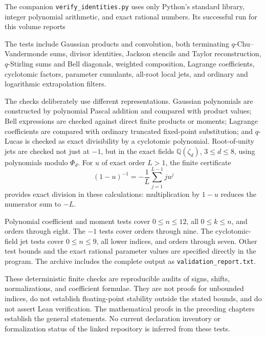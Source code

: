 \documentclass[11pt,a4paper,oneside,openany]{book}
\theoremstyle{definition}
\theoremstyle{remark}
\newcommand{\Q}{\mathbb Q}
\begin{document}
The companion \texttt{verify\_identities.py} uses only Python's standard
library, integer polynomial arithmetic, and exact rational numbers. Its successful
run for this volume reports
\begin{center}
\end{center}
The tests include Gaussian products and convolution, both terminating
\(q\)-Chu--Vandermonde sums, divisor identities, Jackson stencils and Taylor
reconstruction, \(q\)-Stirling sums and Bell diagonals, weighted composition,
Lagrange coefficients, cyclotomic factors, parameter cumulants, all-root local
jets, and ordinary and logarithmic extrapolation filters.

The checks deliberately use different representations. Gaussian polynomials are
constructed by polynomial Pascal addition and compared with product values;
Bell expressions are checked against direct finite products or moments;
Lagrange coefficients are compared with ordinary truncated fixed-point
substitution; and \(q\)-Lucas is checked as exact divisibility by a
cyclotomic polynomial. Root-of-unity jets are checked not just at \(-1\),
but in the exact fields \(\Q(\zeta_d)\), \(3\le d\le8\), using
polynomials modulo \(\Phi_d\). For \(u\) of exact order \(L>1\),
the finite certificate
\[
 (1-u)^{-1}=-\frac1L\sum_{j=1}^{L-1}ju^j
\]
provides exact division in these calculations: multiplication by \(1-u\)
reduces the numerator sum to \(-L\).

Polynomial coefficient and moment tests cover \(0\le n\le12\), all
\(0\le k\le n\), and orders through eight. The \(-1\) tests cover
orders through nine. The cyclotomic-field jet tests cover \(0\le n\le9\),
all lower indices, and orders through seven. Other test bounds and the exact
rational parameter values are specified directly in the program. The archive
includes the complete output as \texttt{validation\_report.txt}.

\begin{auditbox}[title={What this verification establishes}]
These deterministic finite checks are reproducible audits of signs, shifts,
normalizations, and coefficient formulae. They are not proofs for unbounded
indices, do not establish floating-point stability outside the stated bounds,
and do not assert Lean verification. The mathematical proofs in the preceding
chapters establish the general statements. No current declaration inventory or
formalization status of the linked repository is inferred from these tests.
\end{auditbox}
\end{document}
